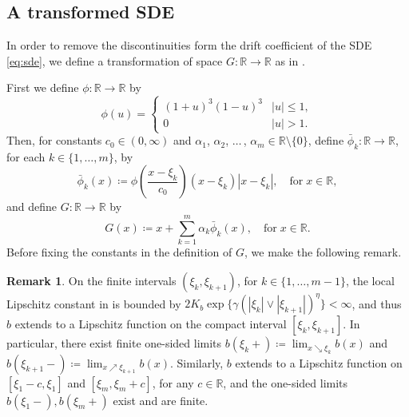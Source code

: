 \documentclass[onseside, final]{amsart}
\theoremstyle{definition}
\newtheorem{remark}[theorem]{Remark}
\newcommand{\R}{\mathbb R}
\numberwithin{equation}{section}
\begin{document}
	\subsection{A transformed SDE}\label{sec:transformation}
		In order to remove the discontinuities form the drift coefficient of the SDE \eqref{eq:sde}, we define a transformation of space $G \colon \R \to \R$ as in \citet{LeSz17}.
		
		First we define $\phi\colon \R \to \R$ by
		\begin{equation}
			\phi(u) =
			\begin{cases}
				(1 + u)^3(1 - u)^3 & |u| \leq 1,\\
				0 & |u|>1.
			\end{cases}
		\end{equation}
		Then, for constants $c_0 \in (0, \infty)$ and $\alpha_1$, $\alpha_2$, $\dotsc\,$, $\alpha_m \in \R \setminus \{0\}$, define $\bar \phi_k \colon \R \to \R$, for each $k \in \{1, \dotsc, m\}$, by
		\begin{equation}\label{eq:phi-bar}
			\bar \phi_k (x) \coloneqq \phi \!\left(\frac{x - \xi_k}{c_0}\right)\!(x - \xi_k)|x - \xi_k|, \quad \text{for} \; x \in \R,
		\end{equation}
		and define $G \colon \R \to \R$ by
		\begin{equation}\label{eq:G-def}
			G(x) \coloneqq x + \sum_{k = 1}^m \alpha_k \bar \phi_k(x), \quad \text{for} \; x \in \R.
		\end{equation}
		Before fixing the constants in the definition of $G$, we make the following remark.
		
		\begin{remark}\label{rem:lip-compacts}
			On the finite intervals $(\xi_k, \xi_{k+1})$, for $k \in \{1, \dotsc, m - 1\}$, the local Lipschitz constant in  is bounded by $2 K_b \exp\{\gamma (|\xi_k| \vee |\xi_{k+1}|)^\eta\} < \infty$, and thus $b$ extends to a Lipschitz function on the compact interval $[\xi_k, \xi_{k + 1}]$. In particular, there exist finite one-sided limits $b(\xi_k+) \coloneqq \lim_{x \searrow \xi_k}b(x)$ and $b(\xi_{k+1}-) \coloneqq \lim_{x \nearrow \xi_{k + 1}}b(x)$. Similarly, $b$ extends to a Lipschitz function on $[\xi_1 - c, \xi_1]$ and $[\xi_m, \xi_m + c]$, for any $c \in \R$, and the one-sided limits $b(\xi_1-), b(\xi_m+)$ exist and are finite.
		\end{remark}
		
\end{document}
